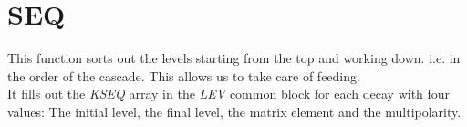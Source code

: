 \section{SEQ}
\label{sect:seq}

\noindent This function sorts out the levels starting from the top and
working down. i.e. in the order of the cascade. This allows us to take care
of feeding.\\

\noindent It fills out the {\em KSEQ} array in the {\em LEV} common block
for each decay with four values: The initial level, the final level, the
matrix element and the multipolarity.\\
